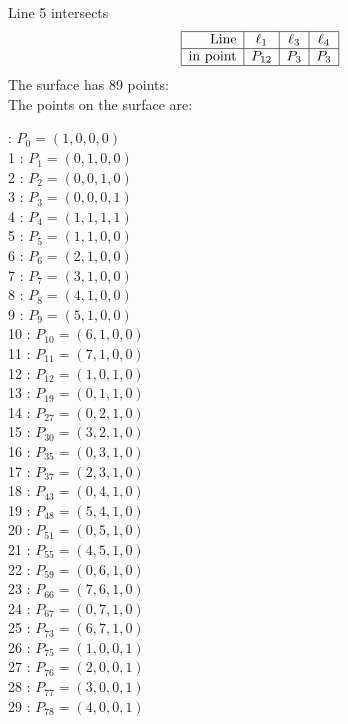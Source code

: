 \documentclass{article}
\begin{document}
{$$$$
Line 5 intersects 
$$
\begin{array}{|r*{3}{|c}|}
\hline
\mbox{Line}  & \ell_{1} & \ell_{3} & \ell_{4}\\
\hline
\mbox{in point}  & P_{12} & P_{3} & P_{3}\\
\hline
\end{array}
$$
The surface has 89 points:\\
The points on the surface are:\\
\begin{multicols}{3}
 : $P_{0}=( 1, 0, 0, 0 )$\\
1 : $P_{1}=( 0, 1, 0, 0 )$\\
2 : $P_{2}=( 0, 0, 1, 0 )$\\
3 : $P_{3}=( 0, 0, 0, 1 )$\\
4 : $P_{4}=( 1, 1, 1, 1 )$\\
5 : $P_{5}=( 1, 1, 0, 0 )$\\
6 : $P_{6}=( 2, 1, 0, 0 )$\\
7 : $P_{7}=( 3, 1, 0, 0 )$\\
8 : $P_{8}=( 4, 1, 0, 0 )$\\
9 : $P_{9}=( 5, 1, 0, 0 )$\\
10 : $P_{10}=( 6, 1, 0, 0 )$\\
11 : $P_{11}=( 7, 1, 0, 0 )$\\
12 : $P_{12}=( 1, 0, 1, 0 )$\\
13 : $P_{19}=( 0, 1, 1, 0 )$\\
14 : $P_{27}=( 0, 2, 1, 0 )$\\
15 : $P_{30}=( 3, 2, 1, 0 )$\\
16 : $P_{35}=( 0, 3, 1, 0 )$\\
17 : $P_{37}=( 2, 3, 1, 0 )$\\
18 : $P_{43}=( 0, 4, 1, 0 )$\\
19 : $P_{48}=( 5, 4, 1, 0 )$\\
20 : $P_{51}=( 0, 5, 1, 0 )$\\
21 : $P_{55}=( 4, 5, 1, 0 )$\\
22 : $P_{59}=( 0, 6, 1, 0 )$\\
23 : $P_{66}=( 7, 6, 1, 0 )$\\
24 : $P_{67}=( 0, 7, 1, 0 )$\\
25 : $P_{73}=( 6, 7, 1, 0 )$\\
26 : $P_{75}=( 1, 0, 0, 1 )$\\
27 : $P_{76}=( 2, 0, 0, 1 )$\\
28 : $P_{77}=( 3, 0, 0, 1 )$\\
29 : $P_{78}=( 4, 0, 0, 1 )$\\

\end{multicols}}
\end{document}
